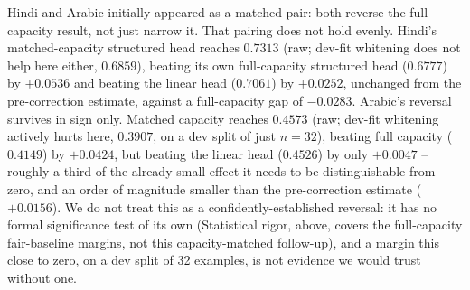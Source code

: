 \documentclass[manuscript]{acmart}
\begin{document}
Hindi and Arabic initially appeared as a matched pair: both reverse the full-capacity result, not just narrow it. That pairing does not hold evenly. Hindi's matched-capacity structured head reaches $0.7313$ (raw; dev-fit whitening does not help here either, $0.6859$), beating its own full-capacity structured head ($0.6777$) by $+0.0536$ and beating the linear head ($0.7061$) by $+0.0252$, unchanged from the pre-correction estimate, against a full-capacity gap of $-0.0283$. Arabic's reversal survives in sign only. Matched capacity reaches $0.4573$ (raw; dev-fit whitening actively hurts here, $0.3907$, on a dev split of just $n{=}32$), beating full capacity ($0.4149$) by $+0.0424$, but beating the linear head ($0.4526$) by only $+0.0047$ -- roughly a third of the already-small effect it needs to be distinguishable from zero, and an order of magnitude smaller than the pre-correction estimate ($+0.0156$). We do not treat this as a confidently-established reversal: it has no formal significance test of its own (Statistical rigor, above, covers the full-capacity fair-baseline margins, not this capacity-matched follow-up), and a margin this close to zero, on a dev split of 32 examples, is not evidence we would trust without one.
\end{document}
